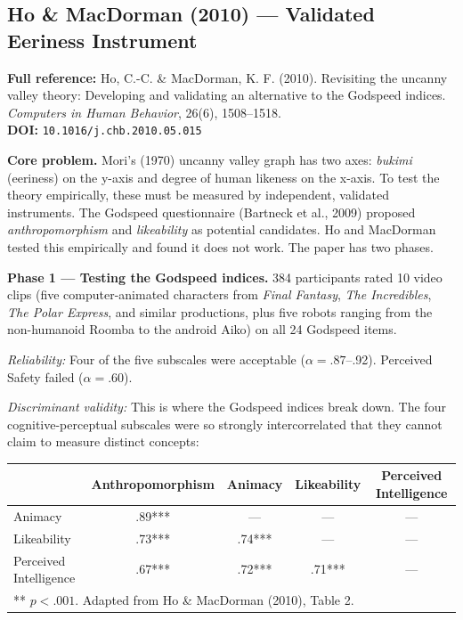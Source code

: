 \documentclass[11pt, a4paper]{article}
\begin{document}
\vspace{8pt}
\subsection{Ho \& MacDorman (2010) --- Validated Eeriness Instrument}

\begin{refbox}
\textbf{Full reference:} Ho, C.-C. \& MacDorman, K. F. (2010). Revisiting the uncanny valley theory: Developing and validating an alternative to the Godspeed indices. \textit{Computers in Human Behavior}, 26(6), 1508--1518.\\[4pt]
\textbf{DOI:} \texttt{10.1016/j.chb.2010.05.015}
\end{refbox}

\textbf{Core problem.} Mori's (1970) uncanny valley graph has two axes: \textit{bukimi} (eeriness) on the y-axis and degree of human likeness on the x-axis. To test the theory empirically, these must be measured by independent, validated instruments. The Godspeed questionnaire (Bartneck et al., 2009) proposed \textit{anthropomorphism} and \textit{likeability} as potential candidates. Ho and MacDorman tested this empirically and found it does not work. The paper has two phases.

\textbf{Phase 1 --- Testing the Godspeed indices.} 384 participants rated 10 video clips (five computer-animated characters from \textit{Final Fantasy}, \textit{The Incredibles}, \textit{The Polar Express}, and similar productions, plus five robots ranging from the non-humanoid Roomba to the android Aiko) on all 24 Godspeed items.

\textit{Reliability:} Four of the five subscales were acceptable ($\alpha = .87$--.92). Perceived Safety failed ($\alpha = .60$).

\textit{Discriminant validity:} This is where the Godspeed indices break down. The four cognitive-perceptual subscales were so strongly intercorrelated that they cannot claim to measure distinct concepts:

\begin{center}
\begin{tabular}{lcccc}
\toprule
 & Anthropomorphism & Animacy & Likeability & Perceived Intelligence \\
\midrule
Animacy & .89*** & --- & --- & --- \\
Likeability & .73*** & .74*** & --- & --- \\
Perceived Intelligence & .67*** & .72*** & .71*** & --- \\
\bottomrule
\multicolumn{5}{l}{\small *** $p < .001$. Adapted from Ho \& MacDorman (2010), Table 2.}
\end{tabular}
\end{center}
\end{document}
